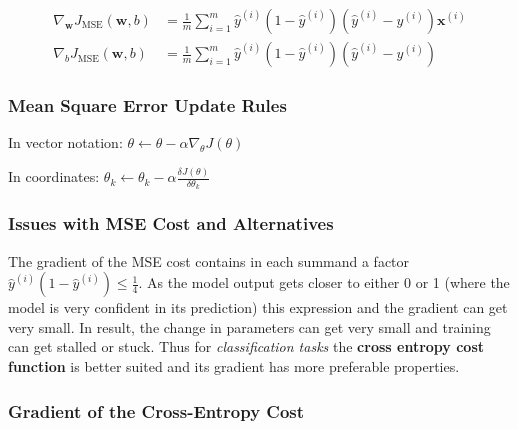 \documentclass[11pt]{article}
\begin{document}
\begin{align*}
	\nabla_{\textbf{w}} J_{\text{MSE}}(\textbf{w},b) &= \frac{1}{m}\sum_{i=1}^{m} \hat{y}^{(i)} (1-\hat{y}^{(i)})(\hat{y}^{(i)} - y^{(i)}) \textbf{x}^{(i)}\\
	\nabla_b J_{\text{MSE}}(\textbf{w},b) &= \frac{1}{m}\sum_{i=1}^{m} \hat{y}^{(i)} (1-\hat{y}^{(i)})(\hat{y}^{(i)} - y^{(i)})
\end{align*}

\subsubsection{Mean Square Error Update Rules}

In vector notation: $ \theta \leftarrow \theta - \alpha\nabla_\theta J(\theta) $

\noindent
In coordinates: $\theta_k \leftarrow \theta_k - \alpha\frac{\delta J(\theta)}{\delta\theta_k}$

\subsubsection{Issues with MSE Cost and Alternatives}
The gradient of the MSE cost contains in each summand a factor $\hat{y}^{(i)} (1-\hat{y}^{(i)}) \leq \frac{1}{4}$. As the model output gets closer to either 0 or 1 (where the model is very confident in its prediction) this expression and the gradient can get very small. In result, the change in parameters can get very small and training can get stalled or stuck. Thus for \emph{classification tasks} the \textbf{cross entropy cost function} is better suited and its gradient has more preferable properties.

\subsubsection{Gradient of the Cross-Entropy Cost}
\end{document}
